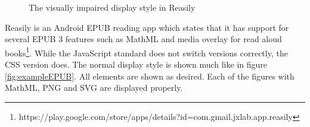 \begin{figure}[h]
\begin{minipage}{0.47\textwidth}
	\end{minipage}
	
	\caption{The visually impaired display style in Reasily}
	\label{fig:reasilyVi}
\end{figure}
Reasily is an Android EPUB reading app which states that it has support for several EPUB 3 features such as MathML and media overlay for read aloud books\footnote{https://play.google.com/store/apps/details?id=com.gmail.jxlab.app.reasily}. While the JavaScript standard does not switch versions correctly, the CSS version does. The normal display style is shown much like in figure \ref{fig:exampleEPUB}. All elements are shown as desired. Each of the figures with MathML, PNG and SVG are displayed properly. 

